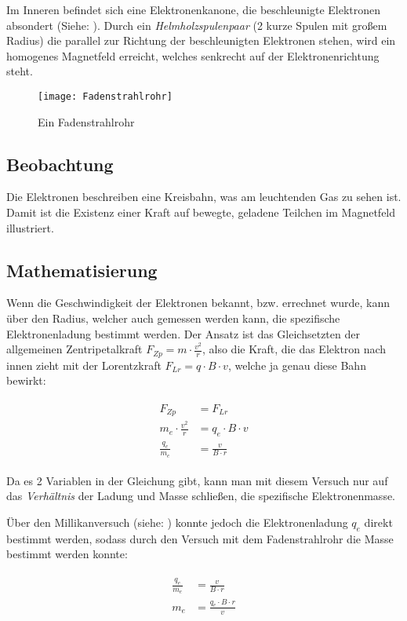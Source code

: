 Im Inneren befindet sich eine Elektronenkanone, die beschleunigte Elektronen absondert (Siehe: ). Durch ein \emph{Helmholzspulenpaar} (2 kurze Spulen mit großem Radius) die parallel zur Richtung der beschleunigten Elektronen stehen, wird ein homogenes Magnetfeld erreicht, welches senkrecht auf der Elektronenrichtung steht.

\begin{figure}[h!]
	\centering
	\texttt{[image: Fadenstrahlrohr]}
	\caption{Ein Fadenstrahlrohr}
	\label{fig:Fadenstrahlrohr}
\end{figure}

\subsection{Beobachtung}

Die Elektronen beschreiben eine Kreisbahn, was am leuchtenden Gas zu sehen ist. Damit ist die Existenz einer Kraft auf bewegte, geladene Teilchen im Magnetfeld illustriert.

\subsection{Mathematisierung}

Wenn die Geschwindigkeit der Elektronen bekannt, bzw. errechnet wurde, kann über den Radius, welcher auch gemessen werden kann, die spezifische Elektronenladung bestimmt werden. Der Ansatz ist das Gleichsetzten der allgemeinen Zentripetalkraft $F_{Zp} = m \cdot \frac{v^2}{r}$, also die Kraft, die das Elektron nach innen zieht mit der Lorentzkraft  $F_{Lr} = q \cdot B \cdot v$, welche ja genau diese Bahn bewirkt:

\begin{align}
\begin{split}
	F_{Zp} &= F_{Lr} \\
	m_e \cdot \frac{v^2}{r} &= q_e \cdot B \cdot v \\
	\frac{q_e}{m_e} &=\frac{v}{B \cdot r}
\end{split}
\end{align}

\noindent Da es 2 Variablen in der Gleichung gibt, kann man mit diesem Versuch nur auf das \emph{Verhältnis} der Ladung und Masse schließen, die \glqq spezifische Elektronenmasse\grqq .

Über den Millikanversuch (siehe: ) konnte jedoch die Elektronenladung $q_e$ direkt bestimmt werden, sodass durch den Versuch mit dem Fadenstrahlrohr die Masse bestimmt werden konnte:

\begin{align}
\begin{split}
	\frac{q_e}{m_e} &=\frac{v}{B \cdot r} \\
	m_e &=\frac{q_e \cdot B \cdot r}{v}
\end{split}
\end{align}





